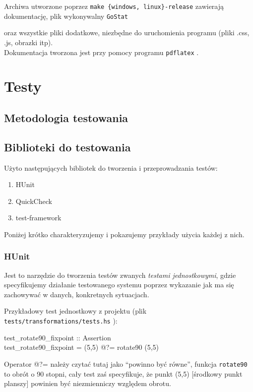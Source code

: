\documentclass[10pt,leqno]{article}
\newcommand{\cmd}[1]{
  \texttt{#1}
}
\begin{document}
\noindent Archiwa utworzone poprzez \cmd{make \{windows, linux\}-release} zawierają dokumentację, plik wykonywalny \cmd{GoStat}
oraz wszystkie pliki dodatkowe, niezbędne do uruchomienia programu (pliki .css, .js, obrazki itp). \\

\noindent Dokumentacja tworzona jest przy pomocy programu \cmd{pdflatex}.

\newpage

\section{Testy}

\subsection{Metodologia testowania}

\subsection{Biblioteki do testowania}

Użyto następujących bibliotek do tworzenia i przeprowadzania testów:

\begin{enumerate}
\item HUnit
\item QuickCheck
\item test-framework
\end{enumerate}

\noindent Poniżej krótko charakteryzujemy i pokazujemy przykłady użycia każdej z nich.

\subsubsection{HUnit}
Jest to narzędzie do tworzenia testów zwanych \emph{testami jednostkowymi}, gdzie 
specyfikujemy działanie testowanego systemu poprzez wykazanie jak ma się zachowywać w
danych, konkretnych sytuacjach.

Przykładowy test jednostkowy z projektu (plik \cmd{tests/transformations/tests.hs}):

\begin{framed}
\noindent test\_rotate90\_fixpoint :: Assertion \\
test\_rotate90\_fixpoint = (5,5) @?= rotate90 (5,5)
\end{framed}

Operator @?= należy czytać tutaj jako ``powinno być równe'', funkcja \cmd{rotate90} to
obrót o 90 stopni, cały test zaś specyfikuje, że punkt (5,5) [środkowy punkt planszy]
powinien być niezmienniczy względem obrotu.
\end{document}
